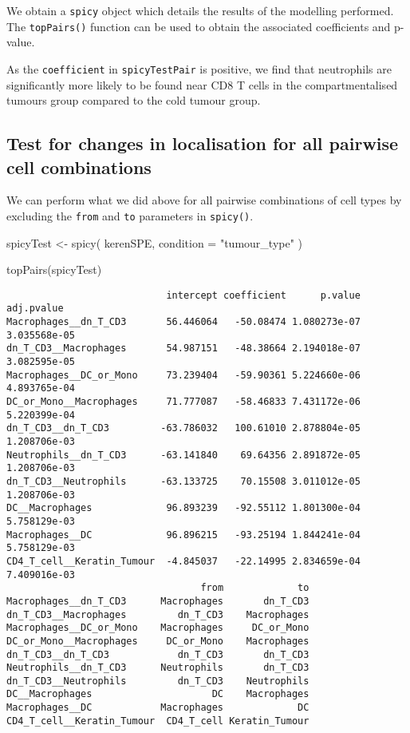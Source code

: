 \documentclass[
  letterpaper,
  DIV=11,
  numbers=noendperiod]{scrreprt}
\newenvironment{Shaded}{\begin{snugshade}}{\end{snugshade}}
\newcommand{\AttributeTok}[1]{\textcolor[rgb]{0.40,0.45,0.13}{#1}}
\newcommand{\FunctionTok}[1]{\textcolor[rgb]{0.28,0.35,0.67}{#1}}
\newcommand{\NormalTok}[1]{\textcolor[rgb]{0.00,0.23,0.31}{#1}}
\newcommand{\OtherTok}[1]{\textcolor[rgb]{0.00,0.23,0.31}{#1}}
\newcommand{\StringTok}[1]{\textcolor[rgb]{0.13,0.47,0.30}{#1}}
\begin{document}
We obtain a \texttt{spicy} object which details the results of the
modelling performed. The \texttt{topPairs()} function can be used to
obtain the associated coefficients and p-value.

As the \texttt{coefficient} in \texttt{spicyTestPair} is positive, we
find that neutrophils are significantly more likely to be found near CD8
T cells in the compartmentalised tumours group compared to the cold
tumour group.

\subsection{Test for changes in localisation for all pairwise cell
combinations}\label{test-for-changes-in-localisation-for-all-pairwise-cell-combinations}

We can perform what we did above for all pairwise combinations of cell
types by excluding the \texttt{from} and \texttt{to} parameters in
\texttt{spicy()}.

\begin{Shaded}
\begin{Highlighting}[]
\NormalTok{spicyTest }\OtherTok{\textless{}{-}} \FunctionTok{spicy}\NormalTok{(}
\NormalTok{  kerenSPE,}
  \AttributeTok{condition =} \StringTok{"tumour\_type"}
\NormalTok{)}

\FunctionTok{topPairs}\NormalTok{(spicyTest)}
\end{Highlighting}
\end{Shaded}

\begin{verbatim}
                            intercept coefficient      p.value   adj.pvalue
Macrophages__dn_T_CD3       56.446064   -50.08474 1.080273e-07 3.035568e-05
dn_T_CD3__Macrophages       54.987151   -48.38664 2.194018e-07 3.082595e-05
Macrophages__DC_or_Mono     73.239404   -59.90361 5.224660e-06 4.893765e-04
DC_or_Mono__Macrophages     71.777087   -58.46833 7.431172e-06 5.220399e-04
dn_T_CD3__dn_T_CD3         -63.786032   100.61010 2.878804e-05 1.208706e-03
Neutrophils__dn_T_CD3      -63.141840    69.64356 2.891872e-05 1.208706e-03
dn_T_CD3__Neutrophils      -63.133725    70.15508 3.011012e-05 1.208706e-03
DC__Macrophages             96.893239   -92.55112 1.801300e-04 5.758129e-03
Macrophages__DC             96.896215   -93.25194 1.844241e-04 5.758129e-03
CD4_T_cell__Keratin_Tumour  -4.845037   -22.14995 2.834659e-04 7.409016e-03
                                  from             to
Macrophages__dn_T_CD3      Macrophages       dn_T_CD3
dn_T_CD3__Macrophages         dn_T_CD3    Macrophages
Macrophages__DC_or_Mono    Macrophages     DC_or_Mono
DC_or_Mono__Macrophages     DC_or_Mono    Macrophages
dn_T_CD3__dn_T_CD3            dn_T_CD3       dn_T_CD3
Neutrophils__dn_T_CD3      Neutrophils       dn_T_CD3
dn_T_CD3__Neutrophils         dn_T_CD3    Neutrophils
DC__Macrophages                     DC    Macrophages
Macrophages__DC            Macrophages             DC
CD4_T_cell__Keratin_Tumour  CD4_T_cell Keratin_Tumour
\end{verbatim}
\end{document}
